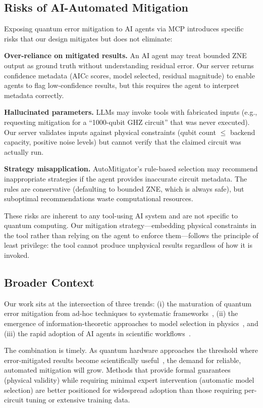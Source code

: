 \subsection{Risks of AI-Automated Mitigation}

Exposing quantum error mitigation to AI agents via MCP introduces specific risks that our design mitigates but does not eliminate:

\textbf{Over-reliance on mitigated results.} An AI agent may treat bounded ZNE output as ground truth without understanding residual error. Our server returns confidence metadata (AICc scores, model selected, residual magnitude) to enable agents to flag low-confidence results, but this requires the agent to interpret metadata correctly.

\textbf{Hallucinated parameters.} LLMs may invoke tools with fabricated inputs (e.g., requesting mitigation for a ``1000-qubit GHZ circuit'' that was never executed). Our server validates inputs against physical constraints (qubit count $\leq$ backend capacity, positive noise levels) but cannot verify that the claimed circuit was actually run.

\textbf{Strategy misapplication.} AutoMitigator's rule-based selection may recommend inappropriate strategies if the agent provides inaccurate circuit metadata. The rules are conservative (defaulting to bounded ZNE, which is always safe), but suboptimal recommendations waste computational resources.

These risks are inherent to any tool-using AI system and are not specific to quantum computing. Our mitigation strategy---embedding physical constraints in the tool rather than relying on the agent to enforce them---follows the principle of least privilege: the tool cannot produce unphysical results regardless of how it is invoked.

\subsection{Broader Context}

Our work sits at the intersection of three trends: (i) the maturation of quantum error mitigation from ad-hoc techniques to systematic frameworks~\cite{Cai2023, Endo2021}, (ii) the emergence of information-theoretic approaches to model selection in physics~\cite{Burnham2002}, and (iii) the rapid adoption of AI agents in scientific workflows~\cite{Anthropic2024}.

The combination is timely. As quantum hardware approaches the threshold where error-mitigated results become scientifically useful~\cite{Kim2023}, the demand for reliable, automated mitigation will grow. Methods that provide formal guarantees (physical validity) while requiring minimal expert intervention (automatic model selection) are better positioned for widespread adoption than those requiring per-circuit tuning or extensive training data.
